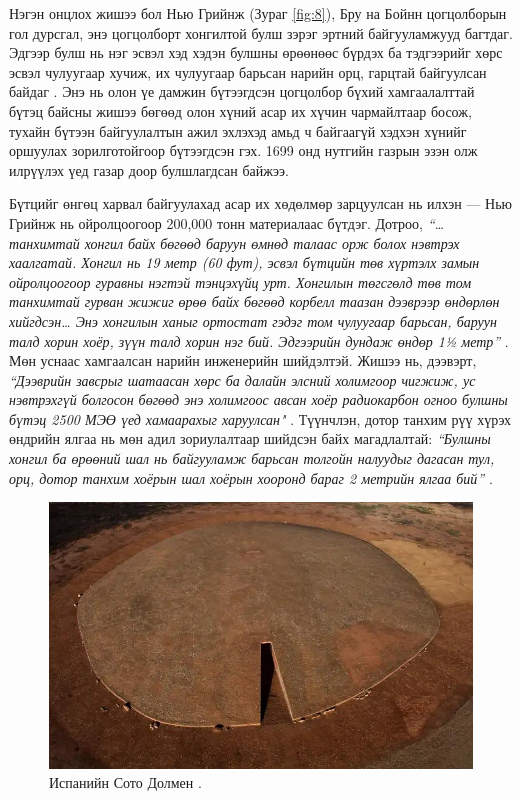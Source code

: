 \documentclass[10pt,twocolumn,letterpaper]{article}
\begin{document}
Нэгэн онцлох жишээ бол Нью Грийнж (Зураг \ref{fig:8}), Бру на Бойнн цогцолборын гол дурсгал, энэ цогцолборт хонгилтой булш зэрэг эртний байгууламжууд багтдаг. Эдгээр булш нь нэг эсвэл хэд хэдэн булшны өрөөнөөс бүрдэх ба тэдгээрийг хөрс эсвэл чулуугаар хучиж, их чулуугаар барьсан нарийн орц, гарцтай байгуулсан байдаг \cite{70}. Энэ нь олон үе дамжин бүтээгдсэн цогцолбор бүхий хамгаалалттай бүтэц байсны жишээ бөгөөд олон хүний асар их хүчин чармайлтаар босож, тухайн бүтээн байгуулалтын ажил эхлэхэд амьд ч байгаагүй хэдхэн хүнийг оршуулах зорилготойгоор бүтээгдсэн гэх. 1699 онд нутгийн газрын эзэн олж илрүүлэх үед газар доор булшлагдсан байжээ.

Бүтцийг өнгөц харвал байгуулахад асар их хөдөлмөр зарцуулсан нь илхэн — Нью Грийнж нь ойролцоогоор 200,000 тонн материалаас бүтдэг. Дотроо, \textit{“…танхимтай хонгил байх бөгөөд баруун өмнөд талаас орж болох нэвтрэх хаалгатай. Хонгил нь 19 метр (60 фут), эсвэл бүтцийн төв хүртэлх замын ойролцоогоор гуравны нэгтэй тэнцэхүйц урт. Хонгилын төгсгөлд төв том танхимтай гурван жижиг өрөө байх бөгөөд корбелл таазан дээврээр өндөрлөн хийгдсэн… Энэ хонгилын ханыг ортостат гэдэг том чулуугаар барьсан, баруун талд хорин хоёр, зүүн талд хорин нэг бий. Эдгээрийн дундаж өндөр 1½ метр”} \cite{70}. Мөн уснаас хамгаалсан нарийн инженерийн шийдэлтэй. Жишээ нь, дээвэрт, \textit{“Дээврийн завсрыг шатаасан хөрс ба далайн элсний холимгоор чигжиж, ус нэвтрэхгүй болгосон бөгөөд энэ холимгоос авсан хоёр радиокарбон огноо булшны бүтэц 2500 МЭӨ үед хамаарахыг харуулсан"} \cite{71}. Түүнчлэн, дотор танхим рүү хүрэх өндрийн ялгаа нь мөн адил зориулалтаар шийдсэн байх магадлалтай: \textit{“Булшны хонгил ба өрөөний шал нь байгууламж барьсан толгойн налуудыг дагасан тул, орц, дотор танхим хоёрын шал хоёрын хооронд бараг 2 метрийн ялгаа бий”} \cite{71}.

\begin{figure}[b]

\begin{center}
   \includegraphics[width=1\linewidth]{dolmen.jpg}
\end{center}
   \caption{Испанийн Сото Долмен \cite{53}.}
\label{fig:9}
\label{fig:onecol}
\end{figure}
\end{document}
